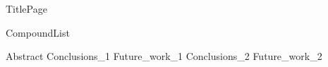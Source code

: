 \documentclass[10pt,a4paper]{article}
\begin{document}
{TitlePage}

{CompoundList}

\tableofcontents

{Abstract}
%
%
%
{Conclusions_1}
{Future_work_1}
%
{Conclusions_2}
{Future_work_2}
%


\newpage
{}


\listoftodos
\end{document}
